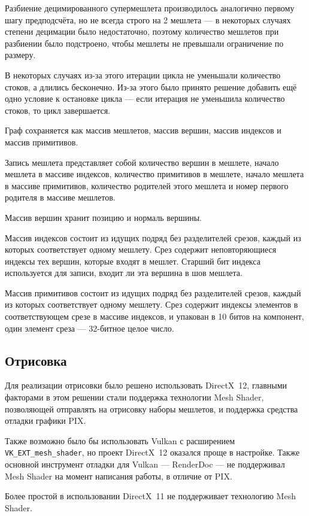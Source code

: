 Разбиение децимированного супермешлета производилось аналогично первому шагу предподсчёта, но не всегда строго на 2 мешлета --- в некоторых случаях степени децимации было недостаточно, поэтому количество мешлетов при разбиении было подстроено, чтобы мешлеты не превышали ограничение по размеру.

В некоторых случаях из-за этого итерации цикла не уменьшали количество стоков, а длились бесконечно.
Из-за этого было принято решение добавить ещё одно условие к остановке цикла --- если итерация не уменьшила количество стоков, то цикл завершается.

Граф сохраняется как массив мешлетов, массив вершин, массив индексов и массив примитивов.

Запись мешлета представляет собой количество вершин в мешлете, начало мешлета в массиве индексов, количество примитивов в мешлете, начало мешлета в массиве примитивов, количество родителей этого мешлета и номер первого родителя в массиве мешлетов.

Массив вершин хранит позицию и нормаль вершины.

Массив индексов состоит из идущих подряд без разделителей срезов, каждый из которых соответствует одному мешлету.
Срез содержит неповторяющиеся индексы тех вершин, которые входят в мешлет.
Старший бит индекса используется для записи, входит ли эта вершина в шов мешлета.

Массив примитивов состоит из идущих подряд без разделителей срезов, каждый из которых соответствует одному мешлету.
Срез содержит индексы элементов в соответствующем срезе в массиве индексов, и упакован в 10 битов на компонент, один элемент среза --- 32-битное целое число.

\subsection{Отрисовка}
Для реализации отрисовки было решено использовать DirectX~12, главными факторами в этом решении стали поддержка технологии Mesh Shader, позволяющей отправлять на отрисовку наборы мешлетов, и поддержка средства отладки графики PIX.

Также возможно было бы использовать Vulkan с расширением \\
\texttt{VK\_EXT\_mesh\_shader}, но проект DirectX~12 оказался проще в настройке.
Также основной инструмент отладки для Vulkan --- RenderDoc --- не поддерживал Mesh Shader на момент написания работы, в отличие от PIX.

Более простой в использовании DirectX~11 не поддерживает технологию Mesh Shader.

